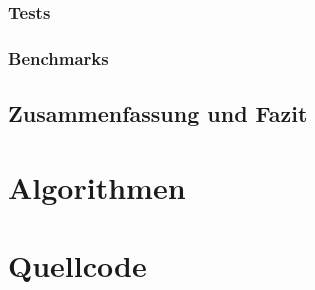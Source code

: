 \documentclass[a4paper,12pt,oneside,german,toc=bibliography]{scrbook}
\theoremstyle{definition}
\theoremstyle{plain}
\numberwithin{equation}{section}
\begin{document}
\subsection{Tests}     
\subsection{Benchmarks}


\section{Zusammenfassung und Fazit}




\appendix


\chapter{Algorithmen}






\chapter{Quellcode}
\label{chap:Quellcode}






\end{document}
